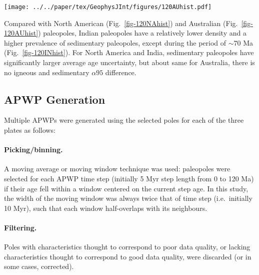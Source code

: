 \begin{figure*}
\centering
\texttt{[image: ../../paper/tex/GeophysJInt/figures/120AUhist.pdf]}
\caption[Distribution of 120 Ma Australian paleopoles]{Temporal
distribution of 120 Ma Australian paleopoles. For black bars,
only four poles, 100 Ma (RESULTNO 1106), 10 Ma
(RESULTNO 1208), 4 Ma (RESULTNO 140) and 1 Ma (RESULTNO
1963), are from sedimentary and also igneous. For red bars, only one pole,
65 Ma (RESULTNO 1872), is from igneous and also sedimentary rocks,
and only one pole, 1 Ma (RESULTNO 1147), is from igneous and also
metamorphic rocks. See Fig.~\ref{fig-120NAhist} for more
information.}\label{fig-120AUhist}
\end{figure*}

\bigskip
Compared with North American (Fig.~\ref{fig-120NAhist}) and Australian
(Fig.~\ref{fig-120AUhist}) paleopoles, Indian paleopoles have a relatively lower
density and a higher prevalence of sedimentary paleopoles, except during the
period of ${\sim}70$ Ma (Fig.~\ref{fig-120INhist}). For North
America and India, sedimentary paleopoles have significantly larger average age
uncertainty, but about same for Australia, there is no igneous and sedimentary
${\alpha}95$ difference.

\subsection{APWP Generation}\label{sec:apwpg}

Multiple APWPs were generated using the selected poles for each of the three
plates as follows:

\paragraph{Picking/binning.} A moving average or moving window technique was
used: paleopoles were selected for each APWP time step (initially 5 Myr step
length from 0 to 120 Ma) if their age fell within a window centered on the
current step age. In this study, the width of the moving window was always twice
that of time step (i.e.\ initially 10 Myr), such that each window half-overlaps
with its neighbours.

\paragraph{Filtering.} Poles with characteristics thought to correspond to
poor data quality, or lacking characteristics thought to correspond to good
data quality, were discarded (or in some cases, corrected).

